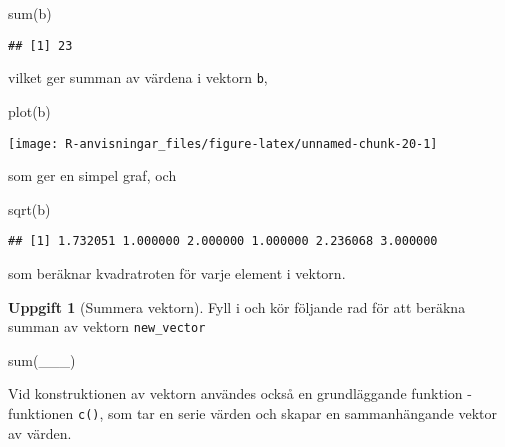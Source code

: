 \documentclass[
]{book}
\newenvironment{Shaded}{\begin{snugshade}}{\end{snugshade}}
\newcommand{\FunctionTok}[1]{\textcolor[rgb]{0.00,0.00,0.00}{#1}}
\newcommand{\NormalTok}[1]{#1}
\theoremstyle{definition}
\theoremstyle{definition}
\theoremstyle{definition}
\newtheorem{exercise}{Uppgift}[chapter]
\theoremstyle{definition}
\theoremstyle{remark}
\begin{document}
\begin{Shaded}
\begin{Highlighting}[]
\FunctionTok{sum}\NormalTok{(b)}
\end{Highlighting}
\end{Shaded}

\begin{verbatim}
## [1] 23
\end{verbatim}

vilket ger summan av värdena i vektorn \texttt{b},

\begin{Shaded}
\begin{Highlighting}[]
\FunctionTok{plot}\NormalTok{(b)}
\end{Highlighting}
\end{Shaded}

\begin{center}\texttt{[image: R-anvisningar\_files/figure-latex/unnamed-chunk-20-1]} \end{center}

som ger en simpel graf, och

\begin{Shaded}
\begin{Highlighting}[]
\FunctionTok{sqrt}\NormalTok{(b)}
\end{Highlighting}
\end{Shaded}

\begin{verbatim}
## [1] 1.732051 1.000000 2.000000 1.000000 2.236068 3.000000
\end{verbatim}

som beräknar kvadratroten för varje element i vektorn.

\begin{exercise}[Summera vektorn]

Fyll i och kör följande rad för att beräkna summan av vektorn \texttt{new\_vector}

\begin{Shaded}
\begin{Highlighting}[]
\FunctionTok{sum}\NormalTok{(\_\_\_)}
\end{Highlighting}
\end{Shaded}

\end{exercise}

Vid konstruktionen av vektorn användes också en grundläggande funktion - funktionen \texttt{c()}, som tar en serie värden och skapar en sammanhängande vektor av värden.
\end{document}
